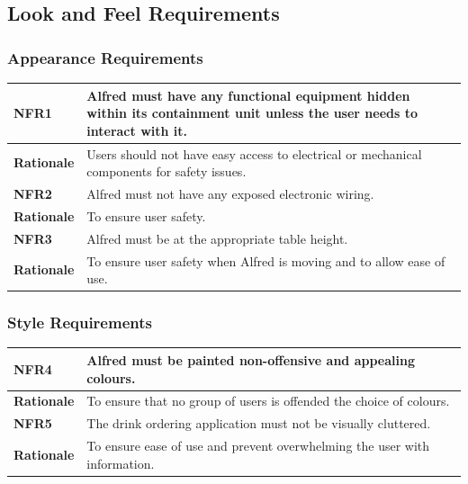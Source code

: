 \documentclass [11pt]{article}
\begin{document}
\subsection {Look and Feel Requirements}

\subsubsection{Appearance Requirements}
	
\begin{longtable}{| p{ } | p{ } | }\hline 
\rowcolor{tableCell}\textbf{NFR1} & Alfred must have any functional equipment hidden within its containment unit unless the user needs to interact with it. \\ \hline
\textbf{Rationale} & Users should not have easy access to electrical or mechanical components for safety issues.\\ \hline 
\rowcolor{tableCell}\textbf{NFR2} & Alfred must not have any exposed electronic wiring. \\ \hline
\textbf{Rationale} & To ensure user safety.\\ \hline 
\rowcolor{tableCell}\textbf{NFR3} & Alfred must be at the appropriate table height. \\ \hline
\textbf{Rationale} & To ensure user safety when Alfred is moving and to allow ease of use.\\ \hline 
\end{longtable}

\subsubsection{Style Requirements}

\begin{longtable}{| p{ } | p{ } | }\hline 
\rowcolor{tableCell}\textbf{NFR4} & Alfred must be painted non-offensive and appealing colours. \\ \hline
\textbf{Rationale} & To ensure that no group of users is offended the choice of colours. \\ \hline  
\rowcolor{tableCell}\textbf{NFR5} & The drink ordering application must not be visually cluttered. \\ \hline
\textbf{Rationale} & To ensure ease of use and prevent overwhelming the user with information.\\ \hline 
\end{longtable}
\end{document}
